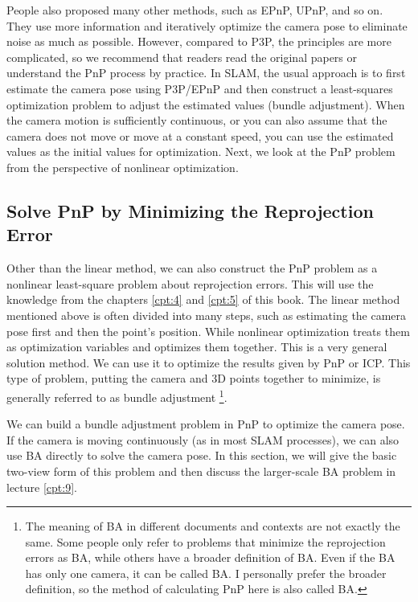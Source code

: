 People also proposed many other methods, such as EPnP, UPnP, and so on. They use more information and iteratively optimize the camera pose to eliminate noise as much as possible. However, compared to P3P, the principles are more complicated, so we recommend that readers read the original papers or understand the PnP process by practice. In SLAM, the usual approach is to first estimate the camera pose using P3P/EPnP and then construct a least-squares optimization problem to adjust the estimated values (bundle adjustment). When the camera motion is sufficiently continuous, or you can also assume that the camera does not move or move at a constant speed, you can use the estimated values as the initial values for optimization. Next, we look at the PnP problem from the perspective of nonlinear optimization.

\subsection{Solve PnP by Minimizing the Reprojection Error}
\label{sec:BA-vo1}
Other than the linear method, we can also construct the PnP problem as a nonlinear least-square problem about reprojection errors. This will use the knowledge from the chapters \ref{cpt:4} and \ref{cpt:5} of this book. The linear method mentioned above is often divided into many steps, such as estimating the camera pose first and then the point's position. While nonlinear optimization treats them as optimization variables and optimizes them together. This is a very general solution method. We can use it to optimize the results given by PnP or ICP. This type of problem, putting the camera and 3D points together to minimize, is generally referred to as bundle adjustment \footnote{The meaning of BA in different documents and contexts are not exactly the same. Some people only refer to problems that minimize the reprojection errors as BA, while others have a broader definition of BA. Even if the BA has only one camera, it can be called BA. I personally prefer the broader definition, so the method of calculating PnP here is also called BA.}.

We can build a bundle adjustment problem in PnP to optimize the camera pose. If the camera is moving continuously (as in most SLAM processes), we can also use BA directly to solve the camera pose. In this section, we will give the basic two-view form of this problem and then discuss the larger-scale BA problem in lecture \ref{cpt:9}.

